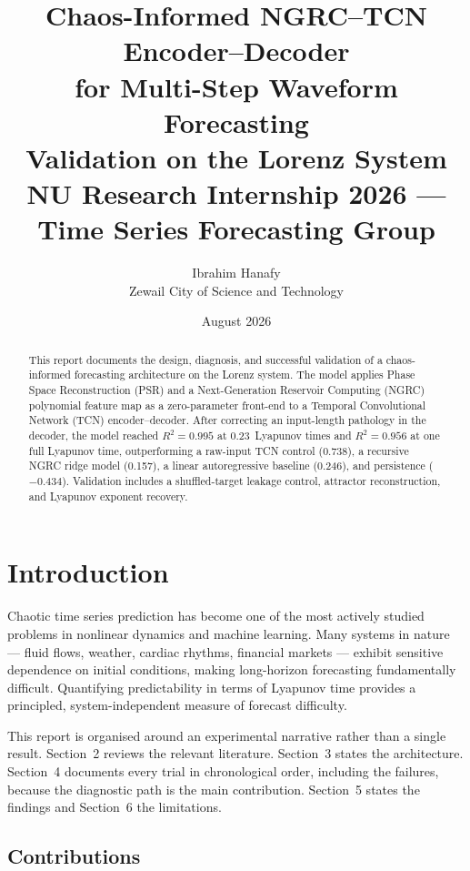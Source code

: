 \documentclass[11pt,a4paper]{article}
\title{%
  Chaos-Informed NGRC--TCN Encoder--Decoder\\
  for Multi-Step Waveform Forecasting\\[0.3em]
  \large Validation on the Lorenz System\\[0.5em]
  \normalsize NU Research Internship 2026 --- Time Series Forecasting Group
}
\author{
  Ibrahim Hanafy\\
  Zewail City of Science and Technology
}
\date{August 2026}
\begin{document}
\maketitle

\begin{abstract}
This report documents the design, diagnosis, and successful validation of a chaos-informed forecasting architecture on the Lorenz system.
The model applies Phase Space Reconstruction (PSR) and a Next-Generation Reservoir Computing (NGRC) polynomial feature map as a zero-parameter front-end to a Temporal Convolutional Network (TCN) encoder--decoder.
After correcting an input-length pathology in the decoder, the model reached $R^2 = 0.995$ at 0.23~Lyapunov times and $R^2 = 0.956$ at one full Lyapunov time, outperforming a raw-input TCN control (0.738), a recursive NGRC ridge model (0.157), a linear autoregressive baseline (0.246), and persistence ($-0.434$).
Validation includes a shuffled-target leakage control, attractor reconstruction, and Lyapunov exponent recovery.
\end{abstract}

\tableofcontents
\newpage

\section{Introduction}

Chaotic time series prediction has become one of the most actively studied problems in nonlinear dynamics and machine learning.
Many systems in nature --- fluid flows, weather, cardiac rhythms, financial markets --- exhibit sensitive dependence on initial conditions, making long-horizon forecasting fundamentally difficult.
Quantifying predictability in terms of Lyapunov time provides a principled, system-independent measure of forecast difficulty.

This report is organised around an experimental narrative rather than a single result.
Section~2 reviews the relevant literature.
Section~3 states the architecture.
Section~4 documents every trial in chronological order, including the failures, because the diagnostic path is the main contribution.
Section~5 states the findings and Section~6 the limitations.

\subsection{Contributions}
\end{document}
